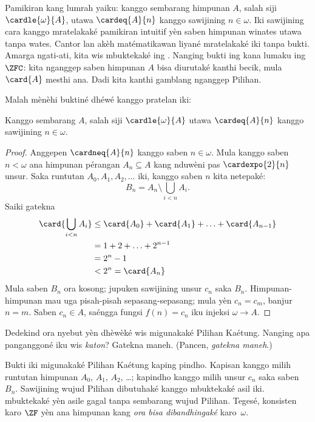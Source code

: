 \documentclass[../../../include/open-logic-section]{subfiles}
\begin{document}
\begin{ex}
Pamikiran kang lumrah yaiku: kanggo sembarang himpunan $A$, salah siji
$\cardle{\omega}{A}$, utawa $\cardeq{A}{n}$ kanggo sawijining
$n \in \omega$. Iki sawijining cara kanggo mratelakaké pamikiran
intuitif yèn saben himpunan winates utawa tanpa wates. Cantor lan
akèh matématikawan liyané mratelakaké iki tanpa bukti. Amarga ngati-ati,
kita wis mbuktekaké ing
. Nanging bukti
ing kana lumaku ing $\ZFC$: kita nganggep saben himpunan $A$ bisa
diurutaké kanthi becik, mula $\card{A}$ mesthi ana. Dadi kita kanthi
gamblang nganggep Pilihan.

Malah \citet{Dedekind1888} mènèhi buktiné dhéwé kanggo
pratelan iki:

\begin{thm}
Kanggo sembarang $A$, salah siji $\cardle{\omega}{A}$ utawa
$\cardeq{A}{n}$ kanggo sawijining $n \in \omega$.
\end{thm}

\begin{proof}
Anggepen $\cardneq{A}{n}$ kanggo saben $n \in \omega$. Mula kanggo
saben $n < \omega$ ana himpunan pérangan $A_n \subseteq A$ kang
nduwèni pas $\cardexpo{2}{n}$ unsur. Saka runtutan $A_0, A_1, A_2,
\ldots$ iki, kanggo saben $n$ kita netepaké:
\[
	B_n = A_n \setminus \bigcup_{i < n} A_i.
\]
Saiki gatekna
\begin{align*}
	\card{\bigcup_{i < n}A_i}
	&\leq \card{A_0} + \card{A_1} + \ldots + \card{A_{n-1}}\\
	&=1 + 2 + \ldots + 2^{n-1}\\
	& = 2^n - 1\\
	& < 2^n = \card{A_n}
\end{align*}
Mula saben $B_n$ ora kosong; jupuken sawijining unsur $c_n$ saka
$B_n$. Himpunan-himpunan mau uga pisah-pisah sepasang-sepasang;
mula yèn $c_n = c_m$, banjur $n = m$. Saben $c_n \in A$, saéngga
fungsi $f(n) = c_n$ iku injeksi $\omega \to A$.
\end{proof}
\noindent
Dedekind ora nyebut yèn dhèwèké wis migunakaké Pilihan Kaétung.
Nanging apa panganggoné iku wis \emph{katon}? Gatekna maneh.
(Pancen, \emph{gatekna maneh}.)

Bukti iki migunakaké Pilihan Kaétung kaping pindho. Kapisan kanggo
milih runtutan himpunan $A_0$, $A_1$, $A_2$, \dots\@; kapindho
kanggo milih unsur $c_n$ saka saben~$B_n$. Sawijining wujud Pilihan dibutuhaké
kanggo mbuktekaké asil iki. \citet[kaca~138]{Cohen1966} mbuktekaké yèn
asile gagal tanpa sembarang wujud Pilihan. Tegesé, konsisten karo
$\ZF$ yèn ana himpunan kang \emph{ora bisa dibandhingaké} karo~$\omega$.
\end{ex}
\end{document}
